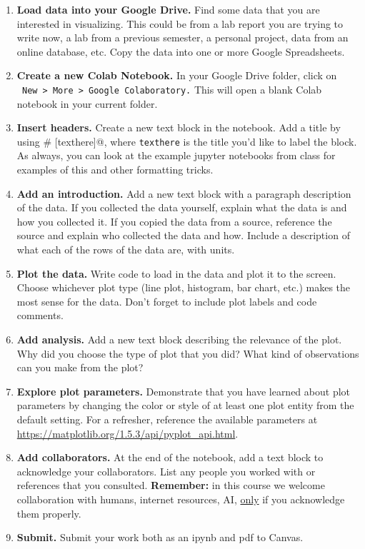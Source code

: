 \documentclass[12pt]{article}
\begin{document}
\begin{enumerate} %
\item \textbf{Load data into your Google Drive.} Find some data that you are interested in visualizing. This could be from a lab report you are trying to write now, a lab from a previous semester, a personal project, data from an online database, etc. Copy the data into one or more Google Spreadsheets.
\item \textbf{Create a new Colab Notebook.} In your Google Drive folder, click on \\ \verb# New > More > Google Colaboratory.# This will open a blank Colab notebook in your current folder.
\item \textbf{Insert headers.} Create a new text block in the notebook. Add a title by using \verb@ # [texthere]@, where \verb#texthere# is the title you'd like to label the block. As always, you can look at the example jupyter notebooks from class for examples of this and other formatting tricks.
\item \textbf{Add an introduction.} Add a new text block with a paragraph description of the data. If you collected the data yourself, explain what the data is and how you collected it. If you copied the data from a source, reference the source and explain who collected the data and how. Include a description of what each of the rows of the data are, with units.
\item \textbf{Plot the data.} Write code to load in the data and plot it to the screen. Choose whichever plot type (line plot, histogram, bar chart, etc.) makes the most sense for the data. Don't forget to include plot labels and code comments.
\item \textbf{Add analysis.} Add a new text block describing the relevance of the plot. Why did you choose the type of plot that you did? What kind of observations can you make from the plot?
\item \textbf{Explore plot parameters.} Demonstrate that you have learned about plot parameters by changing the color or style of at least one plot entity from the default setting. For a refresher, reference the available parameters at \url{https://matplotlib.org/1.5.3/api/pyplot_api.html}.
\item \textbf{Add collaborators.} At the end of the notebook, add a text block to acknowledge your collaborators. List any people you worked with or references that you consulted. \textbf{Remember:} in this course we welcome collaboration with humans, internet resources, AI, \uline{only} if you acknowledge them properly.
\item \textbf{Submit.} Submit your work both as an ipynb and pdf to Canvas.
\end{enumerate}


 
\end{document}
